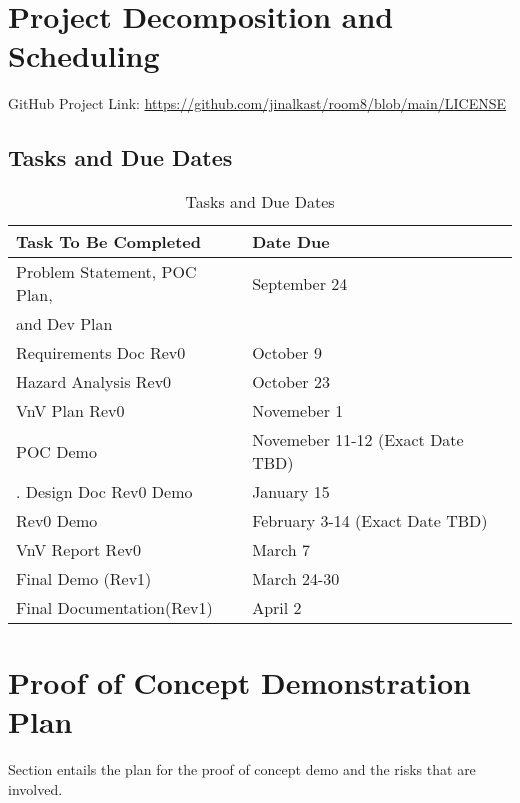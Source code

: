 \documentclass[12pt, titlepage]{article}
\begin{document}
\section{Project Decomposition and Scheduling}
GitHub Project Link: \href{https://github.com/jinalkast/room8/blob/main/LICENSE}{\underline{https://github.com/jinalkast/room8/blob/main/LICENSE}} 
\subsection{Tasks and Due Dates}

\begin{table}[H]
\caption{Tasks and Due Dates}
\label{tab:due-dates}
\begin{tabular}{|l|l|}
\hline
\textbf{Task To Be Completed} & \textbf{Date Due} \\ \hline
Problem Statement, POC Plan, & September 24 \\ 
and Dev Plan & \\ \hline
Requirements Doc Rev0 & October 9 \\ \hline
Hazard Analysis Rev0 & October 23 \\ \hline
VnV Plan Rev0 & Novemeber 1 \\ \hline
POC Demo & Novemeber 11-12 (Exact Date TBD) \\ \hline.
Design Doc Rev0 Demo & January 15 \\ \hline
Rev0 Demo & February 3-14 (Exact Date TBD) \\ \hline
VnV Report Rev0 & March 7 \\ \hline
Final Demo (Rev1) & March 24-30\\ \hline
Final Documentation(Rev1) & April 2 \\ \hline
\end{tabular}
\end{table}

\section{Proof of Concept Demonstration Plan}
Section entails the plan for the proof of concept demo and the risks that are involved.
\end{document}

